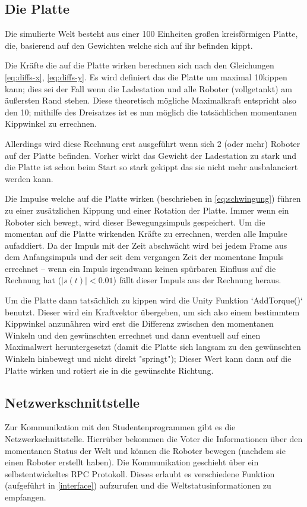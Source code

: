 \subsection{Die Platte}\label{plate}
Die simulierte Welt besteht aus einer 100 Einheiten gro{\ss}en kreisf{\"{o}}rmigen Platte, die, basierend auf den Gewichten welche sich auf ihr befinden kippt.

Die Kr{\"{a}}fte die auf die Platte wirken berechnen sich nach den Gleichungen \ref{eq:diffs-x}, \ref{eq:diffs-y}. Es wird definiert das die Platte um
maximal 10\textdegree kippen kann; dies sei der Fall wenn die Ladestation und alle Roboter (vollgetankt) am {\"{a}}u{\ss}ersten Rand stehen. Diese theoretisch
m{\"{o}}gliche Maximalkraft entspricht also den 10\textdegree; mithilfe des Dreisatzes ist es nun m{\"{o}}glich die tats{\"{a}}chlichen momentanen Kippwinkel
zu errechnen.

Allerdings wird diese Rechnung erst ausgef{\"{u}}hrt wenn sich 2 (oder mehr) Roboter auf der Platte befinden. Vorher wirkt das Gewicht der Ladestation zu
stark und die Platte ist schon beim Start so stark gekippt das sie nicht mehr ausbalanciert werden kann.

Die Impulse welche auf die Platte wirken (beschrieben in \ref{eq:schwingung}) f{\"{u}}hren zu einer zus{\"{a}}tzlichen Kippung und einer Rotation der Platte.
Immer wenn ein Roboter sich bewegt, wird dieser Bewegungsimpuls gespeichert. Um die momentan auf die Platte wirkenden Kr{\"{a}}fte zu errechnen, werden alle
Impulse aufaddiert. Da der Impuls mit der Zeit abschw{\"{a}}cht wird bei jedem Frame aus dem Anfangsimpuls und der seit dem vergangen Zeit der momentane
Impuls errechnet -- wenn ein Impuls irgendwann keinen sp{\"{u}}rbaren Einfluss auf die Rechnung hat ($ |s(t)| < 0.01$) f{\"{a}}llt dieser Impuls aus der
Rechnung heraus.

Um die Platte dann tats{\"{a}}chlich zu kippen wird die Unity Funktion `AddTorque()` benutzt. Dieser wird ein Kraftvektor {\"{u}}bergeben, um sich also einem
bestimmtem Kippwinkel anzun{\"{a}}hren wird erst die Differenz zwischen den momentanen Winkeln und den gew{\"{u}}nschten errechnet und dann eventuell auf
einen Maximalwert heruntergesetzt (damit die Platte sich langsam zu den gew{\"{u}}nschten Winkeln hinbewegt und nicht direkt "springt"); Dieser Wert kann dann
auf die Platte wirken und rotiert sie in die gew{\"{u}}nschte Richtung.

\subsection{Netzwerkschnittstelle}
Zur Kommunikation mit den Studentenprogrammen gibt es die Netzwerkschnittstelle. Hierr{\"{u}}ber bekommen die Voter die Informationen {\"{u}}ber den momentanen
Status der Welt und k{\"{o}}nnen die Roboter bewegen (nachdem sie einen Roboter erstellt haben). Die Kommunikation geschieht {\"{u}}ber ein selbstentwickeltes
RPC Protokoll. Dieses erlaubt es verschiedene Funktion (aufgef{\"{u}}hrt in \ref{interface}) aufzurufen und die Weltstatusinformationen zu empfangen.

